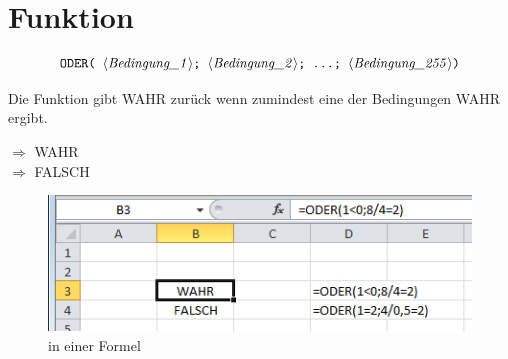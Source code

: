 
\section{ Funktion}

$$ \text{\stmt{ODER( \syntax{Bedingung\_1}; \syntax{Bedingung\_2}; \ldots; \syntax{Bedingung\_255})}} $$

Die  Funktion gibt WAHR zurück wenn zumindest eine der Bedingungen WAHR ergibt.

\begin{description}[labelindent=0cm, leftmargin=3cm, font=\mdseries, labelwidth=3cm,style=nextline]
\item[Beispiele]  $\Rightarrow$ WAHR \\
 $\Rightarrow$ FALSCH
\end{description}
%
%
	\begin{figure}[H]
		\centering
			\includegraphics[scale=0.7]{images/oder_1b}
		\caption{ in einer Formel}
		\label{fig:oder}
	\end{figure}
